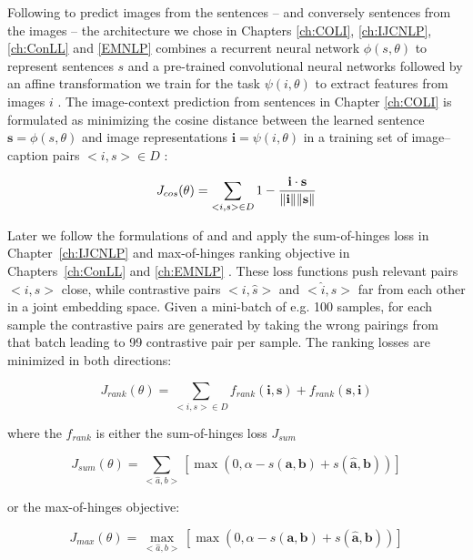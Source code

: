 Following \citep{kiros2014unifying} to predict images from the sentences
-- and conversely sentences from the images --
the architecture we chose in
Chapters \ref{ch:COLI}, \ref{ch:IJCNLP}, \ref{ch:ConLL} and \ref{EMNLP}  combines
a recurrent neural network $\phi(s, \theta)$ to
represent sentences $s$ and a pre-trained convolutional neural networks
followed by an affine transformation we train for the task  $\psi(i, \theta)$
to extract features from images $i$ .
The image-context prediction from sentences in
Chapter \ref{ch:COLI} is formulated  as minimizing the cosine distance
between the learned sentence $\mathbf{s} = \phi(s, \theta)$ and image representations
$\mathbf{i} = \psi(i, \theta)$ in a training set of image--caption pairs $<i,s> \in D$ :

\begin{equation}
J_{cos}(\theta) = \sum_{<i,s> \in D} 1 - \frac{\mathbf{i} \cdot \mathbf{s}}{\| \mathbf{i}\| \| \mathbf{s} \|} \\
\end{equation}

Later we follow the formulations of \cite{vendrov2015order} and \cite{faghri2017vse++} and apply
the sum-of-hinges loss in Chapter~\ref{ch:IJCNLP} and max-of-hinges ranking objective
in Chapters~\ref{ch:ConLL} and \ref{ch:EMNLP} . These loss functions
push relevant pairs $<i, s>$ close, while contrastive pairs  $<i, \hat{s}>$ and $<\hat{i}, s>$
far from each other in a joint embedding space. Given a mini-batch of e.g. 100 samples, for each sample
the contrastive pairs are generated by taking the wrong pairings from that batch leading to
99 contrastive pair per sample. The ranking losses are minimized in both directions:

\begin{equation}
J_{rank}(\theta) = \sum_{<i,s> \in D} f_{rank}(\mathbf{i}, \mathbf{s}) + f_{rank}(\mathbf{s}, \mathbf{i})
\end{equation}

where the $f_{rank}$ is either the sum-of-hinges loss $J_{sum}$

\begin{equation}
\label{eq:sumviol}
J_{sum}(\theta) = \sum_{<\hat{a},b>}[\max(0, \alpha - s(\mathbf{a},\mathbf{b}) + s(\hat{\mathbf{a}}, \mathbf{b}))]
\end{equation}

or the max-of-hinges objective:

\begin{equation}
\label{eq:maxviol}
J_{max}(\theta) = \max_{<\hat{a}, b>}[\max(0, \alpha - s(\mathbf{a},\mathbf{b}) + s(\hat{\mathbf{a}}, \mathbf{b}))]
\end{equation}

